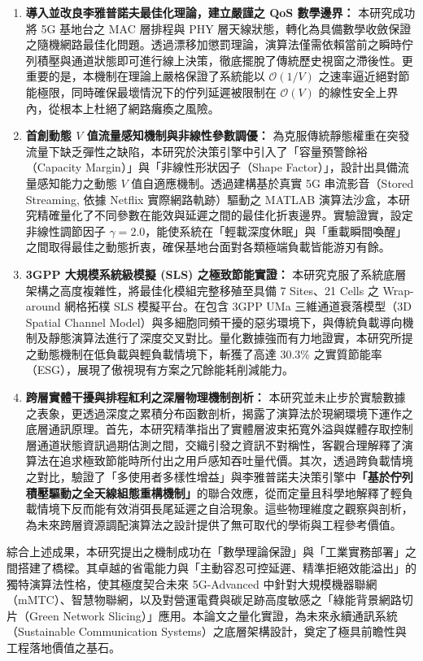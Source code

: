 \begin{enumerate}
    \item \textbf{導入並改良李雅普諾夫最佳化理論，建立嚴謹之 QoS 數學邊界：} 
    本研究成功將 5G 基地台之 MAC 層排程與 PHY 層天線狀態，轉化為具備數學收斂保證之隨機網路最佳化問題。透過漂移加懲罰理論，演算法僅需依賴當前之瞬時佇列積壓與通道狀態即可進行線上決策，徹底擺脫了傳統歷史視窗之滯後性。更重要的是，本機制在理論上嚴格保證了系統能以 $\mathcal{O}(1/V)$ 之速率逼近絕對節能極限，同時確保最壞情況下的佇列延遲被限制在 $\mathcal{O}(V)$ 的線性安全上界內，從根本上杜絕了網路癱瘓之風險。    
    \item \textbf{首創動態 $V$ 值流量感知機制與非線性參數調優：} 
    為克服傳統靜態權重在突發流量下缺乏彈性之缺陷，本研究於決策引擎中引入了「容量預警餘裕（Capacity Margin）」與「非線性形狀因子（Shape Factor）」，設計出具備流量感知能力之動態 $V$ 值自適應機制。透過建構基於真實 5G 串流影音（Stored Streaming, 依據 Netflix 實際網路軌跡）驅動之 MATLAB 演算法沙盒，本研究精確量化了不同參數在能效與延遲之間的最佳化折衷邊界。實驗證實，設定非線性調節因子 $\gamma = 2.0$，能使系統在「輕載深度休眠」與「重載瞬間喚醒」之間取得最佳之動態折衷，確保基地台面對各類極端負載皆能游刃有餘。    
    \item \textbf{3GPP 大規模系統級模擬 (SLS) 之極致節能實證：} 
    本研究克服了系統底層架構之高度複雜性，將最佳化模組完整移殖至具備 7 Sites、21 Cells 之 Wrap-around 網格拓樸 SLS 模擬平台。在包含 3GPP UMa 三維通道衰落模型（3D Spatial Channel Model）與多細胞同頻干擾的惡劣環境下，與傳統負載導向機制及靜態演算法進行了深度交叉對比。量化數據強而有力地證實，本研究所提之動態機制在低負載與輕負載情境下，斬獲了高達 30.3\% 之實質節能率（ESG），展現了傲視現有方案之冗餘能耗削減能力。    
    \item \textbf{跨層實體干擾與排程紅利之深層物理機制剖析：} 
    本研究並未止步於實驗數據之表象，更透過深度之累積分布函數剖析，揭露了演算法於現網環境下運作之底層通訊原理。首先，本研究精準指出了實體層波束拓寬外溢與媒體存取控制層通道狀態資訊過期估測之間，交織引發之資訊不對稱性，客觀合理解釋了演算法在追求極致節能時所付出之用戶感知吞吐量代價。其次，透過跨負載情境之對比，驗證了「多使用者多樣性增益」與李雅普諾夫決策引擎中\textbf{「基於佇列積壓驅動之全天線組態重構機制」}的聯合效應，從而定量且科學地解釋了輕負載情境下反而能有效消弭長尾延遲之自洽現象。這些物理維度之觀察與剖析，為未來跨層資源調配演算法之設計提供了無可取代的學術與工程參考價值。
\end{enumerate}

綜合上述成果，本研究提出之機制成功在「數學理論保證」與「工業實務部署」之間搭建了橋樑。其卓越的省電能力與「主動容忍可控延遲、精準拒絕效能溢出」的獨特演算法性格，使其極度契合未來 5G-Advanced 中針對大規模機器聯網（mMTC）、智慧物聯網，以及對營運電費與碳足跡高度敏感之「綠能背景網路切片（Green Network Slicing）」應用。本論文之量化實證，為未來永續通訊系統（Sustainable Communication Systems）之底層架構設計，奠定了極具前瞻性與工程落地價值之基石。


